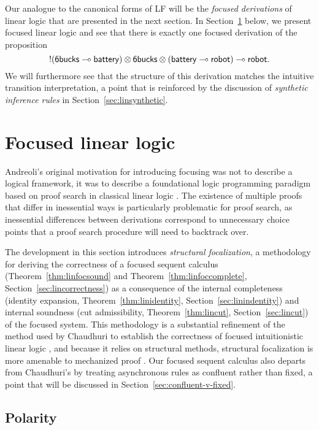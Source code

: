 Our analogue to the canonical forms of LF will be the {\it focused
  derivations} of linear logic that are presented in the next
section. In Section~\ref{sec:foclinlog} below, we present 
focused linear logic and see that there is exactly 
one focused derivation of the proposition
\[{!}({\sf 6bucks} \multimap {\sf battery}) \otimes {\sf 6bucks} \otimes
({\sf battery} \multimap {\sf robot}) \multimap {\sf robot}.\] 
%
We will furthermore see that the structure of this derivation matches
the intuitive transition interpretation, a point
that is reinforced by the discussion of {\it synthetic inference
  rules} in Section~\ref{sec:linsynthetic}. 

\section{Focused linear logic}
\label{sec:foclinlog}

Andreoli's original motivation for introducing focusing was not to
describe a logical framework, it was to describe a foundational logic
programming paradigm based on proof search in classical linear logic
\cite{andreoli92logic}. The existence of multiple proofs that differ
in inessential ways is particularly problematic for proof search, as
inessential differences between derivations correspond to unnecessary
choice points that a proof search procedure will need to backtrack
over. 

The development in this section introduces {\it structural
  focalization}, a methodology for deriving the correctness of a
focused sequent calculus (Theorem~\ref{thm:linfocsound} and
Theorem~\ref{thm:linfoccomplete}, Section~\ref{sec:lincorrectness}) as
a consequence of the internal completeness (identity expansion,
Theorem~\ref{thm:linidentity}, Section~\ref{sec:linindentity}) and
internal soundness (cut admissibility, Theorem~\ref{thm:lincut},
Section~\ref{sec:lincut}) of the focused system. This
methodology is a substantial refinement of the method used by
Chaudhuri to establish the correctness of focused intuitionistic
linear logic \cite{chaudhuri06focused}, and because it relies on
structural methods, structural focalization is more amenable to
mechanized proof \cite{simmons11structural}.  Our focused sequent
calculus also departs from Chaudhuri's by treating asynchronous rules
as confluent rather than fixed, a point that will be discussed in
Section~\ref{sec:confluent-v-fixed}.

\subsection{Polarity}
\label{sec:linpolar}

